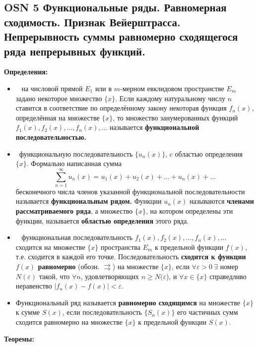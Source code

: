 \subsection{OSN 5 Функциональные ряды. Равномерная сходимость. Признак Вейерштрасса. Непрерывность суммы  равномерно сходящегося ряда непрерывных функций.}

\textbf{Определения:}
\begin{itemize}
    \item \mathLet ~ на числовой прямой $E_1$ или в $m$-мерном евклидовом пространстве $E_m$ задано некоторое множество $\{x\}$.
    Если каждому натуральному числу $n$ ставится в соответствие по определённому закону некоторая функция $f_n(x)$, определённая на множестве $\{x\}$, то множество занумерованных функций $f_1(x),f_2(x),\dots,f_n(x),\dots$ называется \textbf{функциональной последовательностью.}
    
    \item \faEye \ функциональную последовательность $\{u_n(x)\}$, c областью определения $\{x\}$.
    Формально написанная сумма
    $$\displaystyle \sum_{n=1}^{\infty} u_n(x) = u_1(x) + u_2(x) + \dots + u_n(x) + \dots$$
    бесконечного числа членов указанной функциональной последовательности называется \textbf{функциональным рядом.}
    Функции $u_n(x)$ называются \textbf{членами рассматриваемого ряда}, а множество $\{x\}$, на котором определены эти функции, называется \textbf{областью определения} этого ряда.
    
    \item  \mathLet ~ функциональная последовательность
    $f_1(x), f_2(x), \dots, f_n(x), \dots$ сходится на множестве $\{x\}$ пространства $E_m$ к предельной функции $f(x)$, т.е. сходится в каждой его точке.
    Последовательность \textbf{сходится к функции $f(x)$ равномерно} (обозн. $\rightrightarrows$) на множестве $\{x\}$, если $\forall \varepsilon > 0 ~ \exists$ номер $N(\varepsilon)$ такой, что $\forall n$, удовлетворяющих $n \geqslant N(\varepsilon$), и $\forall x \in \{x\}$ справедливо неравенство $|f_n(x) - f(x)| < \varepsilon$.
    
    \item Функциональный ряд называется \textbf{равномерно сходящимся} на множестве $\{x\}$ к сумме $S(x)$, если последовательность $\{S_n(x)\}$ его частичных сумм сходится равномерно на множестве $\{x\}$ к предельной функции $S(x)$.

\end{itemize}


\textbf{Теоремы:}

